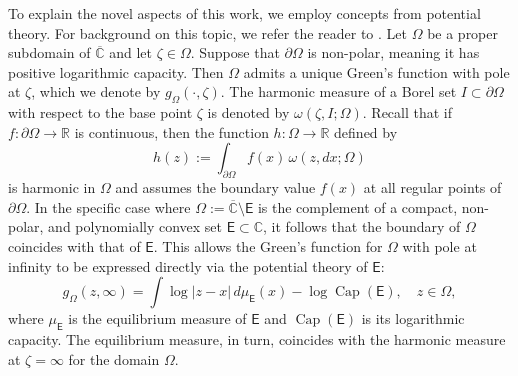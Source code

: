 \documentclass[12pt,oneside,reqno]{amsart}
\theoremstyle{definition}
\numberwithin{equation}{section}
\newcommand{\R}{{\mathbb R}}
\newcommand{\C}{{\mathbb C}}
\newcommand{\E}{{\mathsf E}}
\renewcommand{\Cap}{\operatorname{Cap}}
\begin{document}
To explain the novel aspects of this work, we employ concepts from potential theory. For background on this topic, we refer the reader to \cite{ransford95, garnett-marschall05, landkof72, armitage-gardiner01}. 
Let $\Omega$ be a proper subdomain of $\overline{\C}$ and let $\zeta\in\Omega$. Suppose that $\partial\Omega$ is non-polar, meaning it has positive logarithmic capacity. Then $\Omega$ admits a unique Green's function with pole at $\zeta$, which we denote by $g_{\Omega}(\cdot, \zeta)$. 
The harmonic measure of a Borel set $I\subset\partial\Omega$ with respect to the base point $\zeta$ is denoted by $\omega(\zeta, I; \Omega)$. Recall that if $f:\partial\Omega\rightarrow \R$ is continuous, then the function $h: \Omega\to \R$ defined by
\begin{equation}
	h(z) := \int_{\partial \Omega} f(x)\,\omega(z, dx; \Omega)
	\label{eq:harmonic_measure_property}
\end{equation}
is harmonic in $\Omega$ and assumes the boundary value $f(x)$ at all regular points of $\partial\Omega$.
In the specific case where $\Omega := \overline{\C} \setminus \E$ is the complement of a compact, non-polar, and polynomially convex set $\E \subset \C$, it follows that the boundary of $\Omega$ coincides with that of $\E$. This allows the Green's function for $\Omega$ with pole at infinity to be expressed directly via the potential theory of $\E$:
\begin{equation}
g_{\Omega}(z, \infty) = \int \log |z - x|\,d\mu_\E(x) - \log \Cap(\E), \quad z \in \Omega,
\end{equation}
where $\mu_\E$ is the equilibrium measure of $\E$ and $\Cap(\E)$ is its logarithmic capacity. The equilibrium measure, in turn, coincides with the harmonic measure at $\zeta=\infty$ for the domain $\Omega$.
\end{document}

